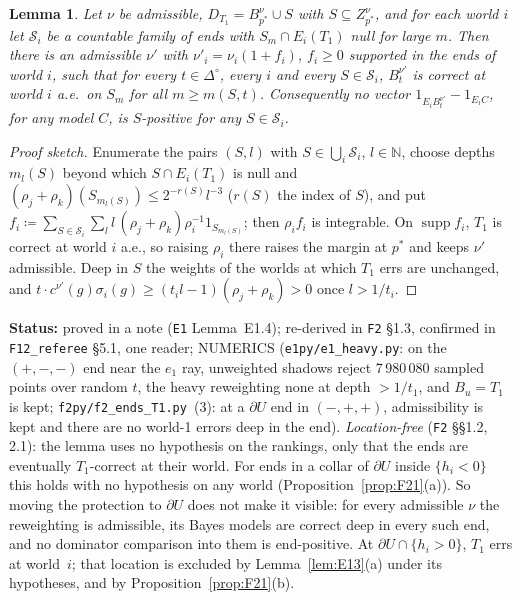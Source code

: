\documentclass[11pt]{article}
\newtheorem{lemma}[theorem]{Lemma}
\theoremstyle{definition}
\theoremstyle{remark}
\newcommand{\Di}{\Delta^{\circ}}
\newcommand{\src}[1]{\texttt{#1}}
\newcommand{\status}[1]{\par\smallskip\noindent\textbf{Status:} #1\par\smallskip}
\begin{document}
\begin{lemma}\label{lem:E14}
Let $\nu$ be admissible, $D_{T_1}=B^\nu_{p^*}\cup S$ with $S\subseteq Z^\nu_{p^*}$, and for each world $i$ let $\mathcal S_i$ be a countable family of ends with $S_m\cap E_i(T_1)$ null for large $m$. Then there is an admissible $\nu'$ with $\nu'_i=\nu_i(1+f_i)$, $f_i\ge0$ supported in the ends of world $i$, such that for every $t\in\Di$, every $i$ and every $S\in\mathcal S_i$, $B^{\nu'}_t$ is correct at world $i$ a.e.\ on $S_m$ for all $m\ge m(S,t)$. Consequently no vector $1_{E_iB^{\nu'}_t}-1_{E_iC}$, for any model $C$, is $S$-positive for any $S\in\mathcal S_i$.
\end{lemma}
\begin{proof}[Proof sketch]
Enumerate the pairs $(S,l)$ with $S\in\bigcup_i\mathcal S_i$, $l\in\mathbb N$, choose depths $m_l(S)$ beyond which $S\cap E_i(T_1)$ is null and $(\rho_j+\rho_k)(S_{m_l(S)})\le2^{-r(S)}l^{-3}$ ($r(S)$ the index of $S$), and put $f_i\coloneqq\sum_{S\in\mathcal S_i}\sum_ll\,(\rho_j+\rho_k)\rho_i^{-1}1_{S_{m_l(S)}}$; then $\rho_if_i$ is integrable. On $\operatorname{supp}f_i$, $T_1$ is correct at world $i$ a.e., so raising $\rho_i$ there raises the margin at $p^*$ and keeps $\nu'$ admissible. Deep in $S$ the weights of the worlds at which $T_1$ errs are unchanged, and $t\cdot c^{\nu'}(g)\sigma_i(g)\ge(t_il-1)(\rho_j+\rho_k)>0$ once $l>1/t_i$.
\end{proof}
\status{proved in a note (\src{E1} Lemma~E1.4); re-derived in \src{F2} \S1.3, confirmed in \src{F12\_referee} \S5.1, one reader; NUMERICS (\src{e1py/e1\_heavy.py}: on the $(+,-,-)$ end near the $e_1$ ray, unweighted shadows reject 7\,980\,080 sampled points over random $t$, the heavy reweighting none at depth $>1/t_1$, and $B_u=T_1$ is kept; \src{f2py/f2\_ends\_T1.py}~(3): at a $\partial U$ end in $(-,+,+)$, admissibility is kept and there are no world-1 errors deep in the end). \emph{Location-free} (\src{F2} \S\S1.2, 2.1): the lemma uses no hypothesis on the rankings, only that the ends are eventually $T_1$-correct at their world. For ends in a collar of $\partial U$ inside $\{h_i<0\}$ this holds with no hypothesis on any world (Proposition~\ref{prop:F21}(a)). So moving the protection to $\partial U$ does not make it visible: for every admissible $\nu$ the reweighting is admissible, its Bayes models are correct deep in every such end, and no dominator comparison into them is end-positive. At $\partial U\cap\{h_i>0\}$, $T_1$ errs at world~$i$; that location is excluded by Lemma~\ref{lem:E13}(a) under its hypotheses, and by Proposition~\ref{prop:F21}(b).}
\end{document}
